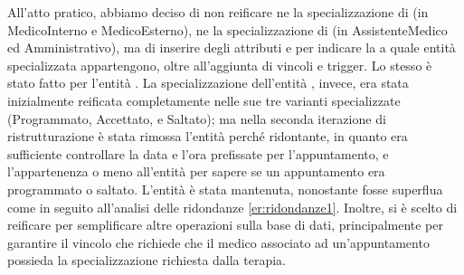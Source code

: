 \documentclass[11pt,a4paper]{article}
\begin{document}
All'atto pratico, abbiamo deciso di non reificare ne la specializzazione di  (in MedicoInterno e MedicoEsterno), ne la specializzazione di  (in AssistenteMedico ed Amministrativo), ma di inserire degli attributi  e  per indicare la a quale entità specializzata appartengono, oltre all'aggiunta di vincoli e trigger. Lo stesso è stato fatto per l'entità .
La specializzazione dell'entità , invece, era stata inizialmente reificata completamente nelle sue tre varianti specializzate (Programmato, Accettato, e Saltato); ma nella seconda iterazione di ristrutturazione è stata rimossa l'entità  perché ridontante, in quanto era sufficiente controllare la data e l'ora prefissate per l'appuntamento, e l'appartenenza o meno all'entità  per sapere se un appuntamento era programmato o saltato. L'entità  è stata mantenuta, nonostante fosse superflua come  in seguito all'analisi delle ridondanze \ref{er:ridondanze1}. Inoltre, si è scelto di reificare  per semplificare altre operazioni sulla base di dati, principalmente per garantire il vincolo che richiede che il medico associato ad un'appuntamento possieda la specializzazione richiesta dalla terapia.
\end{document}
